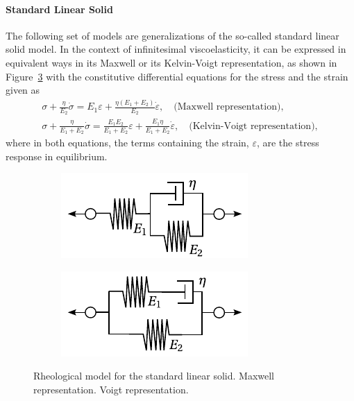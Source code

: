 \paragraph{Standard Linear Solid}
The following set of models are generalizations of the so-called standard linear solid model.
In the context of infinitesimal viscoelasticity, it can be expressed in equivalent ways in its Maxwell or its Kelvin-Voigt representation, as shown in Figure~\ref{fig:rheo_model_sls} with the constitutive differential equations for the stress and the strain given as
\begin{gather}
	\sigma+\frac{\eta}{E_2} \dot{\sigma}=E_1 \varepsilon+\frac{\eta\left(E_1+E_2\right)}{E_2} \dot{\varepsilon},\quad\text{(Maxwell representation)},
	\label{eq:sls_maxwell_rep}\\
	\sigma+\frac{\eta}{E_1+E_2} \dot{\sigma}=\frac{E_1 E_2}{E_1+E_2} \varepsilon+\frac{E_1 \eta}{E_1+E_2} \dot{\varepsilon},\quad\text{(Kelvin-Voigt representation)},
	\label{eq:sls_voigt_rep}
\end{gather}
where in both equations, the terms containing the strain, $\varepsilon$, are the stress response in equilibrium.
\begin{figure}[hbtp]
\centering
\begin{subfigure}[b]{0.45\textwidth}
\centering
\includegraphics[width=\textwidth]{figures/rheo_model_sls_maxwell}
\caption{}
\label{subfig:rheo_model_sls_maxwell}
\end{subfigure} \hfill
	\begin{subfigure}[b]{0.45\textwidth}
		\centering
						\includegraphics[width=\textwidth]{figures/rheo_model_sls_voigt}
						\caption{}
						\label{subfig:rheo_model_sls_voigt}
		\end{subfigure}
	\caption{Rheological model for the standard linear solid.  Maxwell representation.  Voigt representation.}
\label{fig:rheo_model_sls}
\end{figure}

